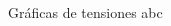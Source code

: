 \documentclass[a4paper, 10pt, onecolumn,journal]{ieeeconf}
\begin{document}
\begin{figure}[H]
	\centering
	\begin{adjustbox}{max width=\columnwidth}
	\end{adjustbox}
	\caption{Gráficas de tensiones abc}
	\label{Gráficas de tensiones abc}
\end{figure}
\end{document}
